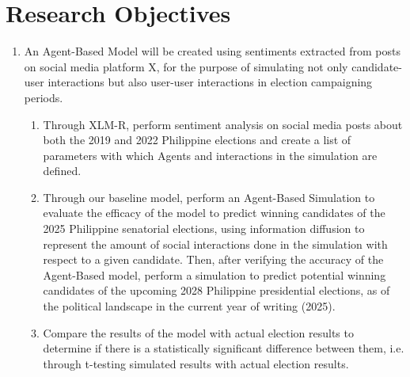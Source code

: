 \section{Research Objectives}
\begin{enumerate}
    \item An Agent-Based Model will be created using sentiments extracted from posts on social media platform X, for the purpose of simulating not only candidate-user interactions but also user-user interactions in election campaigning periods. 
    \begin{enumerate}
        \item Through XLM-R, perform sentiment analysis on social media posts about both the 2019 and 2022 Philippine elections and create a list of parameters with which Agents and interactions in the simulation are defined.
        \item Through our baseline model, perform an Agent-Based Simulation to evaluate the efficacy of the model to predict winning candidates of the 2025 Philippine senatorial elections, using information diffusion to represent the amount of social interactions done in the simulation with respect to a given candidate. Then, after verifying the accuracy of the Agent-Based model, perform a simulation to predict potential winning candidates of the upcoming 2028 Philippine presidential elections, as of the political landscape in the current year of writing (2025).
        \item Compare the results of the model with actual election results to determine if there is a statistically significant difference between them, i.e. through t-testing simulated results with actual election results.
    \end{enumerate}
\end{enumerate}